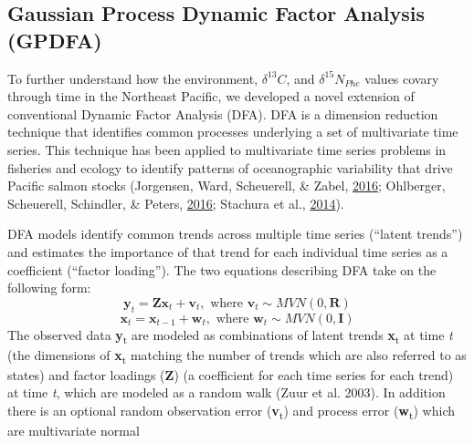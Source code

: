\documentclass [11pt, proquest] {uwthesis}[2015/03/03]
\begin{document}
\subsection{Gaussian Process Dynamic Factor Analysis
(GPDFA)}\label{gaussian-process-dynamic-factor-analysis-gpdfa}

To further understand how the environment, \(\delta^{13}C\), and
\(\delta^{15}N_{Phe}\) values covary through time in the Northeast
Pacific, we developed a novel extension of conventional Dynamic Factor
Analysis (DFA). DFA is a dimension reduction technique that identifies
common processes underlying a set of multivariate time series. This
technique has been applied to multivariate time series problems in
fisheries and ecology to identify patterns of oceanographic variability
that drive Pacific salmon stocks (Jorgensen, Ward, Scheuerell, \& Zabel,
\protect\hyperlink{ref-Jorgensen2016}{2016}; Ohlberger, Scheuerell,
Schindler, \& Peters, \protect\hyperlink{ref-Ohlberger2016}{2016};
Stachura et al., \protect\hyperlink{ref-Stachura2014}{2014}).

DFA models identify common trends across multiple time series (``latent
trends'') and estimates the importance of that trend for each individual
time series as a coefficient (``factor loading''). The two equations
describing DFA take on the following form:
\begin{equation} 
 \boldsymbol{y}_t = \boldsymbol{Zx}_t + \boldsymbol{v}_t,\mbox{ where }\boldsymbol{v}_t \sim MVN(0,\boldsymbol{R})
  \label{eq:gdfa1}
\end{equation}
\begin{equation} 
 \boldsymbol{x}_t = \boldsymbol{x}_{t-1} + \boldsymbol{w}_t,\mbox{ where }\boldsymbol{w}_t \sim MVN(0,\boldsymbol{I})
  \label{eq:gdfa2}
\end{equation}
The observed data \textbf{y}\textsubscript{t} are modeled as
combinations of latent trends \textbf{x}\textsubscript{t} at time
\emph{t} (the dimensions of \textbf{x}\textsubscript{t} matching the
number of trends which are also referred to as states) and factor
loadings (\textbf{Z}) (a coefficient for each time series for each
trend) at time \emph{t}, which are modeled as a random walk (Zuur et al.
2003). In addition there is an optional random observation error
(\textbf{v}\textsubscript{t}) and process error
(\textbf{w}\textsubscript{t}) which are multivariate normal
\end{document}
